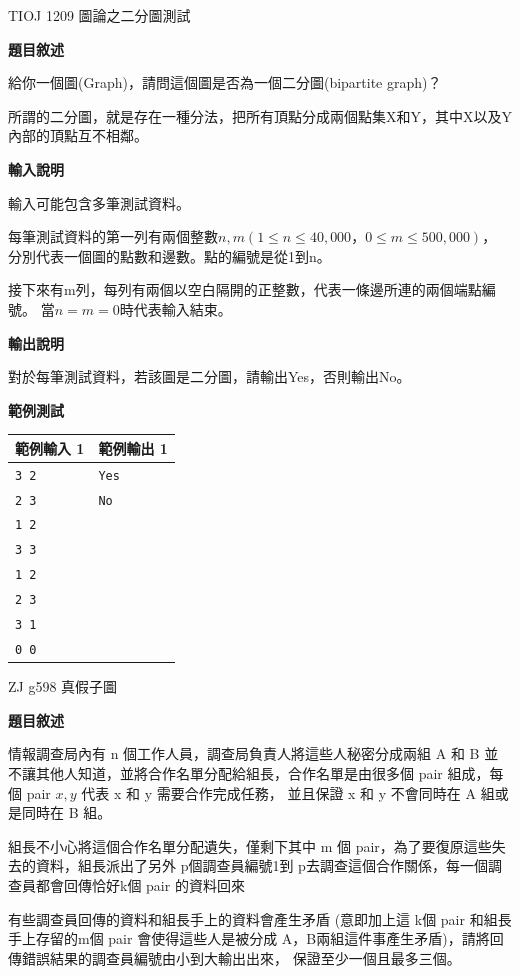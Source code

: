     \problem TIOJ 1209 圖論之二分圖測試

    \textbf{題目敘述}

    給你一個圖(Graph)，請問這個圖是否為一個二分圖(bipartite graph)？

    所謂的二分圖，就是存在一種分法，把所有頂點分成兩個點集X和Y，其中X以及Y內部的頂點互不相鄰。

    \textbf{輸入說明}

    輸入可能包含多筆測試資料。

    每筆測試資料的第一列有兩個整數$n,m(1 \le n \le 40,000，0 \le m \le 500,000)$，
    分別代表一個圖的點數和邊數。點的編號是從1到n。

    接下來有m列，每列有兩個以空白隔開的正整數，代表一條邊所連的兩個端點編號。
    當$n=m=0$時代表輸入結束。

    \textbf{輸出說明}

    對於每筆測試資料，若該圖是二分圖，請輸出Yes，否則輸出No。

    \textbf{範例測試}

    \begin{tabular}{|m{7cm}|m{7cm}|}
        \hline
        範例輸入 1 & 範例輸出 1 \\
        \hline
        \verb|3 2|  & \verb|Yes| \\
        \verb|2 3|  & \verb|No| \\
        \verb|1 2|  &\\
        \verb|3 3|  &\\
        \verb|1 2|  &\\
        \verb|2 3|  &\\
        \verb|3 1|  &\\
        \verb|0 0|  &\\
        \hline
    \end{tabular}

    \problem ZJ g598 真假子圖

    \textbf{題目敘述}

    情報調查局內有 
    n 個工作人員，調查局負責人將這些人秘密分成兩組 
    A 和 B 並不讓其他人知道，並將合作名單分配給組長，合作名單是由很多個 pair 組成，每個 pair 
    $x,y$ 代表 x 和 y 需要合作完成任務，
    並且保證 x 和 y 不會同時在 A 組或是同時在 B 組。

    組長不小心將這個合作名單分配遺失，僅剩下其中 
    m 個 pair，為了要復原這些失去的資料，組長派出了另外 
    p個調查員編號1到 
    p去調查這個合作關係，每一個調查員都會回傳恰好k個 pair 的資料回來

    有些調查員回傳的資料和組長手上的資料會產生矛盾
    (意即加上這 k個 pair 和組長手上存留的m個 pair 會使得這些人是被分成 
    A，B兩組這件事產生矛盾)，請將回傳錯誤結果的調查員編號由小到大輸出出來，
    保證至少一個且最多三個。

